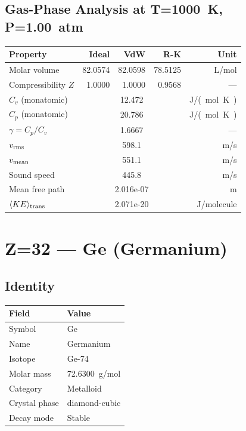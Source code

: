 \documentclass[11pt,a4paper]{article}
\begin{document}
\subsection{Gas-Phase Analysis at T=\SI{1000}{K}, P=\SI{1.00}{atm}}
\begin{tabular}{lrrrr}
  \toprule
  Property & Ideal & VdW & R-K & Unit \\
  \midrule
  Molar volume & 82.0574 & 82.0598 & 78.5125 & \si{L/mol} \\
  Compressibility $Z$ & 1.0000 & 1.0000 & 0.9568 & --- \\
  \midrule
  $C_v$ (monatomic) & \multicolumn{3}{c}{12.472} & \si{J/(mol.K)} \\
  $C_p$ (monatomic) & \multicolumn{3}{c}{20.786} & \si{J/(mol.K)} \\
  $\gamma = C_p/C_v$ & \multicolumn{3}{c}{1.6667} & --- \\
  $v_{\rm rms}$ & \multicolumn{3}{c}{598.1} & \si{m/s} \\
  $v_{\rm mean}$ & \multicolumn{3}{c}{551.1} & \si{m/s} \\
  Sound speed & \multicolumn{3}{c}{445.8} & \si{m/s} \\
  Mean free path & \multicolumn{3}{c}{2.016e-07} & \si{m} \\
  $\langle KE \rangle_{\rm trans}$ & \multicolumn{3}{c}{2.071e-20} & \si{J/molecule} \\
  \bottomrule
\end{tabular}

\newpage

\section{Z=32 --- Ge (Germanium)}
\label{sec:Z32}

\subsection{Identity}
\begin{tabular}{ll}
  \toprule
  Field & Value \\
  \midrule
  Symbol & Ge \\
  Name & Germanium \\
  Isotope & Ge-74 \\
  Molar mass & \SI{72.6300}{g/mol} \\
  Category & Metalloid \\
  Crystal phase & diamond-cubic \\
  Decay mode & Stable \\
  \bottomrule
\end{tabular}
\end{document}
